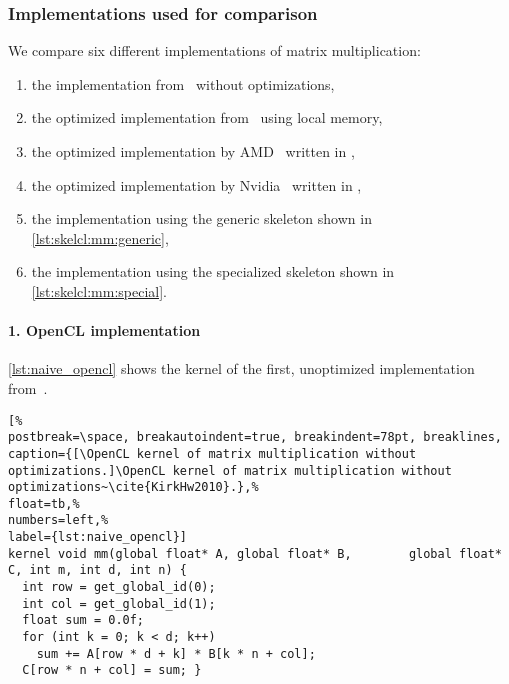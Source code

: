 \subsubsection*{Implementations used for comparison}
We compare six different implementations of matrix multiplication:
\begin{enumerate}
  \item the \OpenCL implementation from~\cite{KirkHw2010} without optimizations,
  \item the optimized \OpenCL implementation from~\cite{KirkHw2010} using \GPU local memory,
  \item the optimized \BLAS implementation by AMD~\cite{APPML} written in \OpenCL,
  \item the optimized \BLAS implementation by Nvidia~\cite{cuBLAS} written in \CUDA,
  \item the \SkelCL implementation using the generic \allpairs skeleton shown in \autoref{lst:skelcl:mm:generic},
  \item the \SkelCL implementation using the specialized \allpairs skeleton shown in \autoref{lst:skelcl:mm:special}.
\end{enumerate}

\paragraph{1. OpenCL implementation}
\autoref{lst:naive_opencl} shows the kernel of the first, unoptimized \OpenCL implementation from~\cite{KirkHw2010}.
\begin{lstlisting}[%                                                             
postbreak=\space, breakautoindent=true, breakindent=78pt, breaklines,
caption={[\OpenCL kernel of matrix multiplication without optimizations.]\OpenCL kernel of matrix multiplication without optimizations~\cite{KirkHw2010}.},%
float=tb,%
numbers=left,%
label={lst:naive_opencl}]
kernel void mm(global float* A, global float* B,        global float* C, int m, int d, int n) {
  int row = get_global_id(0);
  int col = get_global_id(1);
  float sum = 0.0f;
  for (int k = 0; k < d; k++)
    sum += A[row * d + k] * B[k * n + col];
  C[row * n + col] = sum; }
\end{lstlisting}

\vspace{-.5em}
